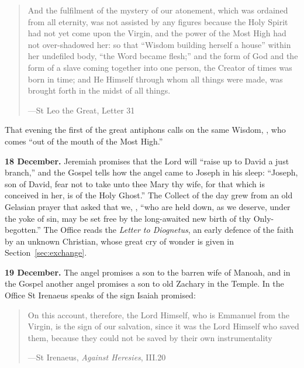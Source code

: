\begin{quote}
And the fulfilment of the mystery of our atonement, which was ordained from all
eternity, was not assisted by any figures because the Holy Spirit had not yet
come upon the Virgin, and the power of the Most High had not over-shadowed her:
so that ``Wisdom building herself a house'' within her undefiled body, ``the
Word became flesh;'' and the form of God and the form of a slave coming together
into one person, the Creator of times was born in time; and He Himself through
whom all things were made, was brought forth in the midst of all things.\par
{\smallskip\noindent\small ---St Leo the Great, Letter 31\par}
\end{quote}

\noindent That evening the first of the great antiphons calls on the same
Wisdom, , who comes ``out of the mouth of the Most High.''

\textbf{18 December.} Jeremiah promises that the Lord will ``raise up to David a
just branch,'' and the Gospel tells how the angel came to Joseph in his sleep:
``Joseph, son of David, fear not to take unto thee Mary thy wife, for that which
is conceived in her, is of the Holy Ghost.'' The Collect of the day grew from an
old Gelasian prayer that asked that we,
, ``who are held down, as we deserve, under the yoke of sin,
may be set free by the long-awaited new birth of thy Only-begotten.'' The Office
reads the \emph{Letter to Diognetus}, an early defence of the faith by an
unknown Christian, whose great cry of wonder is given in
Section~\ref{sec:exchange}.

\textbf{19 December.} The angel promises a son to the barren wife of Manoah, and
in the Gospel another angel promises a son to old Zachary in the Temple. In the
Office St Irenaeus speaks of the sign Isaiah promised:

\begin{quote}
On this account, therefore, the Lord Himself, who is Emmanuel from the Virgin,
is the sign of our salvation, since it was the Lord Himself who saved them,
because they could not be saved by their own instrumentality\par
{\smallskip\noindent\small ---St Irenaeus, \emph{Against Heresies}, III.20\par}
\end{quote}

